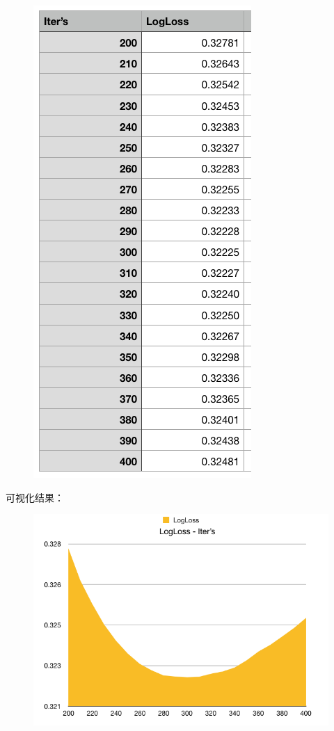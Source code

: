 \documentclass{article}
\begin{document}
\begin{figure}[!h]
\centering
\includegraphics[scale=0.5]{tu13.png}
\end{figure}

\newpage

可视化结果：

\begin{figure}[!h]
\centering
\includegraphics[scale=0.4]{tu14.png}
\end{figure}
\end{document}
